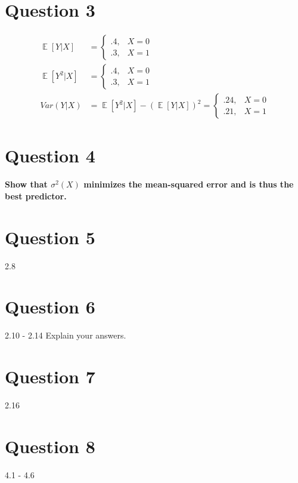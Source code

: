 \documentclass{article}
\DeclareMathOperator{\E}{\mathbb{E}}%
\begin{document}
\pagebreak
\section*{Question 3}
\begin{align*}
	\E[Y|X] &= \begin{cases} .4, & X= 0 \\ .3, & X = 1 \end{cases} \\
	\E[Y^2|X] &= \begin{cases} .4, & X= 0 \\ .3, & X = 1 \end{cases} \\
	Var(Y|X) &= \E[Y^2|X] - \left(\E[Y|X]\right)^2 = \begin{cases} .24, & X= 0 \\ .21, & X = 1 \end{cases} 
\end{align*}


\section*{Question 4}
\textbf{Show that $\sigma^2(X)$ minimizes the mean-squared error and is thus the best predictor.}
\bigskip \\



\section*{Question 5}
 2.8



\section*{Question 6}
2.10 - 2.14 Explain your answers.



\section*{Question 7}
2.16



\section*{Question 8}
4.1 - 4.6



\end{document}
